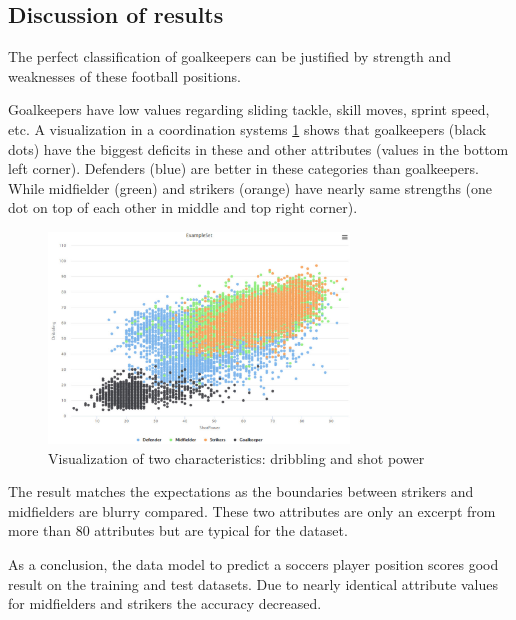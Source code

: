 \subsection{Discussion of results}
\label{sec:DiscussionResults}
The perfect classification of goalkeepers can be justified by strength and weaknesses of these football positions.

 Goalkeepers have low values regarding sliding tackle, skill moves, sprint speed, etc. A visualization in a coordination systems \ref{fig:VisualAttributes} shows that goalkeepers (black dots) have the biggest deficits in these and other attributes (values in the bottom left corner). Defenders (blue) are better in these categories than goalkeepers. While midfielder (green) and strikers (orange) have nearly same strengths (one dot on top of each other in middle and top right corner). 

\begin{figure}
\centering
  \includegraphics[width=8cm]{VisualizationAttributes.jpg}
  \caption{Visualization of two characteristics: dribbling and shot power}
  \label{fig:VisualAttributes}
\end{figure}

The result matches the expectations as the boundaries between strikers and midfielders are blurry compared. These two attributes are only an excerpt from more than 80 attributes but are typical for the dataset.

As a conclusion, the data model to predict a soccers player position scores good result on the training and test datasets. Due to nearly identical attribute values for midfielders and strikers the accuracy decreased.